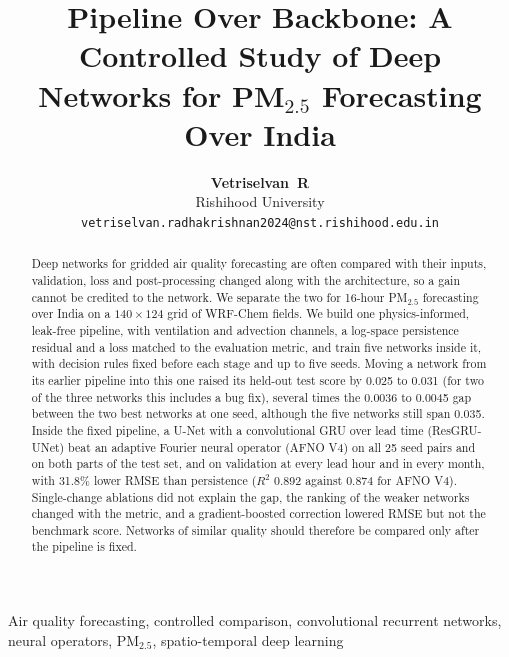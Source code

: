 \documentclass[journal]{IEEEtran}
\newcommand{\PM}{PM$_{2.5}$}
\begin{document}
\title{Pipeline Over Backbone: A Controlled Study of Deep Networks for \PM{} Forecasting Over India}

\author{\textbf{Vetriselvan~R}\\
Rishihood University\\
\texttt{vetriselvan.radhakrishnan2024@nst.rishihood.edu.in}}

\pagestyle{fancy}

\maketitle

\begin{abstract}
Deep networks for gridded air quality forecasting are often compared with their inputs, validation, loss and post-processing changed along with the architecture, so a gain cannot be credited to the network. We separate the two for 16-hour \PM{} forecasting over India on a $140\times124$ grid of WRF-Chem fields. We build one physics-informed, leak-free pipeline, with ventilation and advection channels, a log-space persistence residual and a loss matched to the evaluation metric, and train five networks inside it, with decision rules fixed before each stage and up to five seeds. Moving a network from its earlier pipeline into this one raised its held-out test score by 0.025 to 0.031 (for two of the three networks this includes a bug fix), several times the 0.0036 to 0.0045 gap between the two best networks at one seed, although the five networks still span 0.035. Inside the fixed pipeline, a U-Net with a convolutional GRU over lead time (ResGRU-UNet) beat an adaptive Fourier neural operator (AFNO V4) on all 25 seed pairs and on both parts of the test set, and on validation at every lead hour and in every month, with 31.8\% lower RMSE than persistence ($R^2$ 0.892 against 0.874 for AFNO V4). Single-change ablations did not explain the gap, the ranking of the weaker networks changed with the metric, and a gradient-boosted correction lowered RMSE but not the benchmark score. Networks of similar quality should therefore be compared only after the pipeline is fixed.
\end{abstract}

\begin{IEEEkeywords}
Air quality forecasting, controlled comparison, convolutional recurrent networks, neural operators, \PM, spatio-temporal deep learning
\end{IEEEkeywords}
\end{document}
